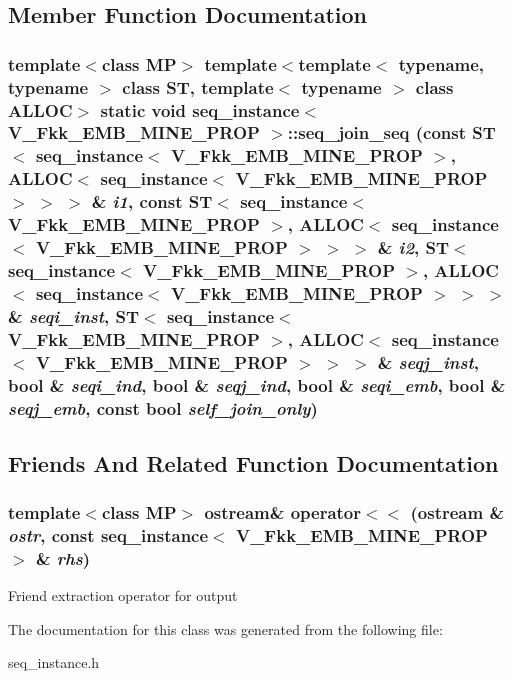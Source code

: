 \subsection{Member Function Documentation}
\subsubsection{\setlength{\rightskip}{0pt plus 5cm}template$<$class MP$>$ template$<$template$<$ typename, typename $>$ class ST, template$<$ typename $>$ class ALLOC$>$ static void \bf{seq\_\-instance}$<$ V\_\-Fkk\_\-EMB\_\-MINE\_\-PROP $>$::seq\_\-join\_\-seq (const ST$<$ \bf{seq\_\-instance}$<$ V\_\-Fkk\_\-EMB\_\-MINE\_\-PROP $>$, ALLOC$<$ \bf{seq\_\-instance}$<$ V\_\-Fkk\_\-EMB\_\-MINE\_\-PROP $>$ $>$ $>$ \& {\em i1}, const ST$<$ \bf{seq\_\-instance}$<$ V\_\-Fkk\_\-EMB\_\-MINE\_\-PROP $>$, ALLOC$<$ \bf{seq\_\-instance}$<$ V\_\-Fkk\_\-EMB\_\-MINE\_\-PROP $>$ $>$ $>$ \& {\em i2}, ST$<$ \bf{seq\_\-instance}$<$ V\_\-Fkk\_\-EMB\_\-MINE\_\-PROP $>$, ALLOC$<$ \bf{seq\_\-instance}$<$ V\_\-Fkk\_\-EMB\_\-MINE\_\-PROP $>$ $>$ $>$ \& {\em seqi\_\-inst}, ST$<$ \bf{seq\_\-instance}$<$ V\_\-Fkk\_\-EMB\_\-MINE\_\-PROP $>$, ALLOC$<$ \bf{seq\_\-instance}$<$ V\_\-Fkk\_\-EMB\_\-MINE\_\-PROP $>$ $>$ $>$ \& {\em seqj\_\-inst}, bool \& {\em seqi\_\-ind}, bool \& {\em seqj\_\-ind}, bool \& {\em seqi\_\-emb}, bool \& {\em seqj\_\-emb}, const bool {\em self\_\-join\_\-only})\hspace{0.3cm}{\tt  [inline, static]}}\label{classseq__instance_3_01V__Fkk__EMB__MINE__PROP_01_4_522267cd130bf49cd3b5975ba30d54bc}




\subsection{Friends And Related Function Documentation}
\subsubsection{\setlength{\rightskip}{0pt plus 5cm}template$<$class MP$>$ ostream\& operator$<$$<$ (ostream \& {\em ostr}, const \bf{seq\_\-instance}$<$ V\_\-Fkk\_\-EMB\_\-MINE\_\-PROP $>$ \& {\em rhs})\hspace{0.3cm}{\tt  [friend]}}\label{classseq__instance_3_01V__Fkk__EMB__MINE__PROP_01_4_49d2cbc2a815e4807ced2f9406c8c859}


Friend extraction operator for output 

The documentation for this class was generated from the following file:\begin{CompactItemize}
\item 
seq\_\-instance.h\end{CompactItemize}
